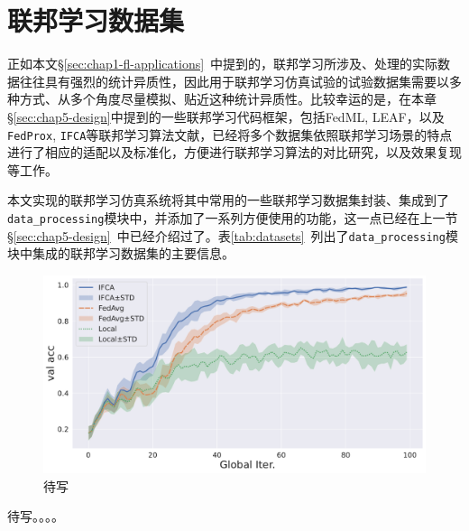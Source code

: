 \section{联邦学习数据集}
\label{sec:chap5-datasets}


正如本文\S\ref{sec:chap1-fl-applications}~中提到的，联邦学习所涉及、处理的实际数据往往具有强烈的统计异质性，因此用于联邦学习仿真试验的试验数据集需要以多种方式、从多个角度尽量模拟、贴近这种统计异质性。比较幸运的是，在本章\S\ref{sec:chap5-design}中提到的一些联邦学习代码框架，包括FedML\cite{he_2020_fedml}, LEAF\cite{caldas2018_leaf}，以及\texttt{FedProx}\cite{sahu2018fedprox}, \texttt{IFCA}\cite{Ghosh_2022_cfl}等联邦学习算法文献，已经将多个数据集依照联邦学习场景的特点进行了相应的适配以及标准化，方便进行联邦学习算法的对比研究，以及效果复现等工作。

本文实现的联邦学习仿真系统将其中常用的一些联邦学习数据集封装、集成到了\texttt{data\_processing}模块中，并添加了一系列方便使用的功能，这一点已经在上一节\S\ref{sec:chap5-design}~中已经介绍过了。表\ref{tab:datasets}~列出了\texttt{data\_processing}模块中集成的联邦学习数据集的主要信息。



\begin{figure}[H]
\centering
\includegraphics[width=\textwidth]{figures/fedproxfemnist.pdf}
\caption{待写}
\label{fig:fedproxfemnist-experiment}
\end{figure}

待写。。。。
